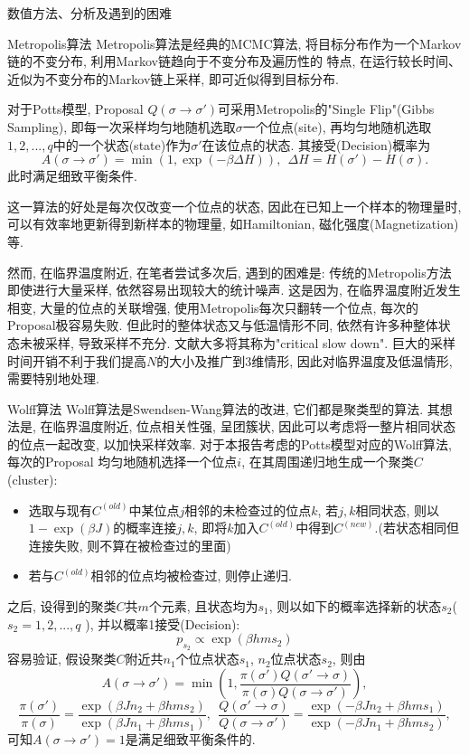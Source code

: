 \documentclass{article}
\begin{document}
\begin{section}{数值方法、分析及遇到的困难}    
    \begin{subsection}{Metropolis算法}
        Metropolis算法是经典的MCMC算法, 将目标分布作为一个Markov链的不变分布, 利用Markov链趋向于不变分布及遍历性的
        特点, 在运行较长时间、近似为不变分布的Markov链上采样, 即可近似得到目标分布.

        对于Potts模型, Proposal $Q(\sigma\to\sigma')$可采用Metropolis的"Single Flip"(Gibbs Sampling), 即每一次采样均匀地随机选取$\sigma$一个位点(site), 
        再均匀地随机选取$1,2,...,q$中的一个状态(state)作为$\sigma'$在该位点的状态. 其接受(Decision)概率为
        $$A(\sigma\to\sigma') = \min(1,\exp(-\beta\Delta H)),\ \ \Delta H = H(\sigma')-H(\sigma).$$
        此时满足细致平衡条件.

        这一算法的好处是每次仅改变一个位点的状态, 因此在已知上一个样本的物理量时, 可以有效率地更新得到新样本的物理量, 如Hamiltonian, 磁化强度(Magnetization)等.

        然而, 在临界温度附近, 在笔者尝试多次后, 遇到的困难是: 传统的Metropolis方法即使进行大量采样, 依然容易出现较大的统计噪声. 这是因为, 在临界温度附近发生相变, 大量的位点的关联增强, 
        使用Metropolis每次只翻转一个位点, 每次的Proposal极容易失败. 但此时的整体状态又与低温情形不同, 依然有许多种整体状态未被采样, 导致采样不充分. 文献大多将其称为"critical slow down".
         巨大的采样时间开销不利于我们提高$N$的大小及推广到3维情形, 因此对临界温度及低温情形, 需要特别地处理.
    \end{subsection}
    \begin{subsection}{Wolff算法}
        Wolff算法是Swendsen-Wang算法的改进, 它们都是聚类型的算法. 其想法是, 在临界温度附近, 位点相关性强, 呈团簇状, 因此可以考虑将一整片相同状态的位点一起改变, 以加快采样效率. 对于本报告考虑的Potts模型对应的Wolff算法, 每次的Proposal
        均匀地随机选择一个位点$i$, 在其周围递归地生成一个聚类$C$ (cluster): 
        \begin{itemize}
            \item 选取与现有$C^{(old)}$中某位点$j$相邻的未检查过的位点$k$, 若$j,k$相同状态, 则以$1-\exp(\beta J)$的概率连接$j,k$, 即将$k$加入$C^{(old)}$中得到$C^{(new)}$.(若状态相同但连接失败, 则不算在被检查过的里面)
            \item 若与$C^{(old)}$相邻的位点均被检查过, 则停止递归.
        \end{itemize}
        之后, 设得到的聚类$C$共$m$个元素, 且状态均为$s_1$, 则以如下的概率选择新的状态$s_2$( $s_2=1,2,...,q$ ), 并以概率1接受(Decision):
        $$p_{s_2} \propto \exp(\beta h m s_2)$$
        容易验证, 假设聚类$C$附近共$n_1$个位点状态$s_1$, $n_2$位点状态$s_2$, 则由
        $$A(\sigma\to\sigma')=\min(1,\frac{\pi(\sigma')Q(\sigma'\to\sigma)}{\pi(\sigma)Q(\sigma\to\sigma')}),$$
        $$\frac{\pi(\sigma')}{\pi(\sigma)} = \frac{\exp(\beta J n_2 + \beta h m s_2)}{\exp(\beta J n_1 + \beta h m s_1)},\ \ \frac{Q(\sigma'\to\sigma)}{Q(\sigma\to\sigma')} = \frac{\exp(-\beta J n_2 + \beta h m s_1)}{\exp(-\beta J n_1 + \beta h m s_2)},$$
        可知$A(\sigma\to\sigma')=1$是满足细致平衡条件的.


\end{subsection}
\end{section}
\end{document}

